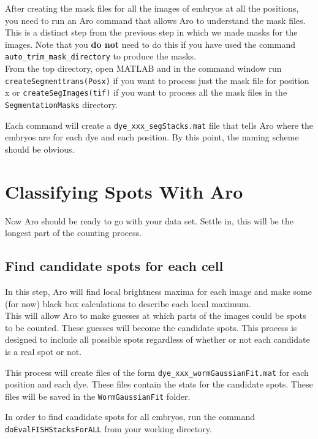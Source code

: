 \documentclass[titlepage,11pt]{article}
\begin{document}
After creating the mask files for all the images of embryos at all the positions, you need to run an Aro command that allows Aro to understand the mask files. This is a distinct step from the previous step in which we made masks for the images. Note that you \textbf{do not} need to do this if you have used the command \texttt{auto\_trim\_mask\_directory} to produce the masks.\\

From the top directory, open MATLAB and in the command window run \texttt{createSegmenttrans(\textquotesingle Posx\textquotesingle)} if you want to process just the mask file for position x or \texttt{createSegImages(\textquotesingle tif\textquotesingle)} if you want to process all the mask files in the \texttt{SegmentationMasks} directory.

Each command will create a \texttt{dye\_xxx\_segStacks.mat} file that tells Aro where the embryos are for each dye and each position. By this point, the naming scheme should be obvious.

\section{Classifying Spots With Aro}

Now Aro should be ready to go with your data set. Settle in, this will be the longest part of the counting process.

\subsection{Find candidate spots for each cell}

In this step, Aro will find local brightness maxima for each image and make some (for now) black box calculations to describe each local maximum.\\

This will allow Aro to make guesses at which parts of the images could be spots to be counted. These guesses will become the candidate spots. This process is designed to include all possible spots regardless of whether or not each candidate is a real spot or not.

This process will create files of the form \texttt{dye\_xxx\_wormGaussianFit.mat} for each position and each dye. These files contain the stats for the candidate spots. These files will be saved in the \texttt{WormGaussianFit} folder.

In order to find candidate spots for all embryos, run the command \texttt{doEvalFISHStacksForALL} from your working directory.
\end{document}
